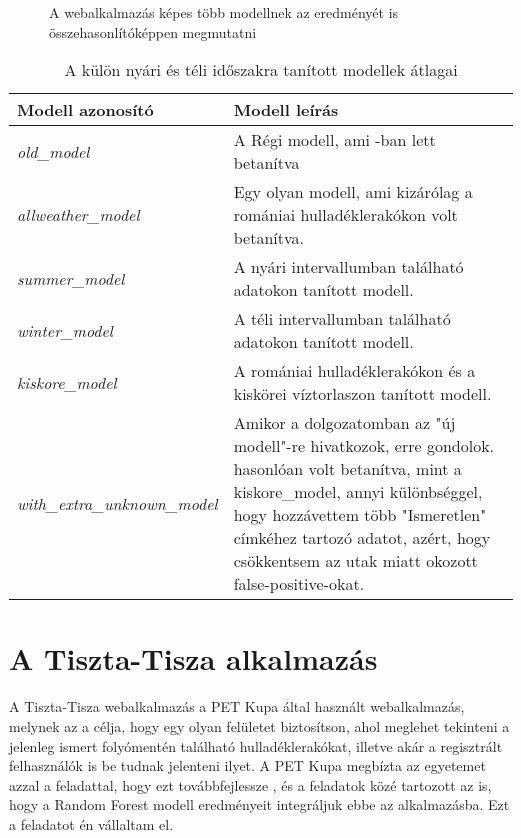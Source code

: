 \begin{figure}[H]
	\centering
	\hspace{5pt}
	\caption{A webalkalmazás képes több modellnek az eredményét is összehasonlítóképpen megmutatni}
	\label{fig:waste-detection-demo}
\end{figure}

\begin{table}[H]
	\centering
	\begin{tabular}{ | p{} | p{} | }
		\hline
		\textbf{Modell azonosító} & \textbf{Modell leírás} \\
		\hline \hline
		\emph{old\_model} & A Régi modell, ami \cite{magyar2023}-ban lett betanítva \\
		\hline
		\emph{allweather\_model} & Egy olyan modell, ami kizárólag a romániai hulladéklerakókon volt betanítva. \\
		\hline
		\emph{summer\_model} & A nyári intervallumban található adatokon tanított modell.  \\
		\hline
        \emph{winter\_model} & A téli intervallumban található adatokon tanított modell. \\
        \hline
        \emph{kiskore\_model} & A romániai hulladéklerakókon és a kiskörei víztorlaszon tanított modell. \\
		\hline
        \emph{with\_extra\_unknown\_model} & Amikor a dolgozatomban az "új modell"-re hivatkozok, erre gondolok. hasonlóan volt betanítva, mint a kiskore\_model, annyi különbséggel, hogy hozzávettem több "Ismeretlen" címkéhez tartozó adatot, azért, hogy csökkentsem az utak miatt okozott false-positive-okat. \\
		\hline
	\end{tabular}
	\caption{A külön nyári és téli időszakra tanított modellek átlagai}
	\label{tab:model-ids}
\end{table}

\section{A Tiszta-Tisza alkalmazás}

A Tiszta-Tisza webalkalmazás  a PET Kupa által használt webalkalmazás, melynek az a célja, hogy egy olyan felületet biztosítson, ahol meglehet tekinteni a jelenleg ismert folyómentén található hulladéklerakókat, illetve akár a regisztrált felhasználók is be tudnak jelenteni ilyet. A PET Kupa megbízta az egyetemet azzal a feladattal, hogy ezt továbbfejlessze , és a feladatok közé tartozott az is, hogy a Random Forest modell eredményeit integráljuk ebbe az alkalmazásba. Ezt a feladatot én vállaltam el.

